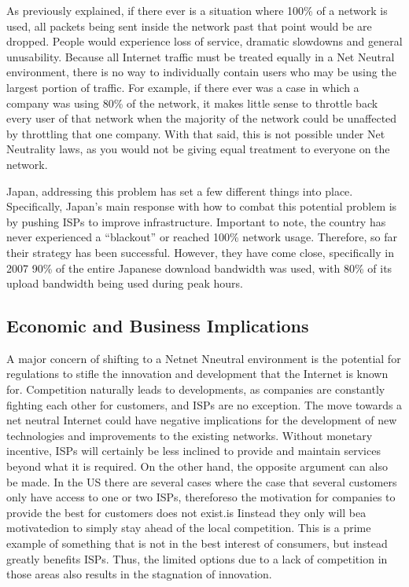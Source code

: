 \documentclass{sigcomm-alternate}
\begin{document}
As previously explained, if there ever is a situation where 100\% of a network is used, all packets being sent inside the network past that point would be are dropped.  People would experience loss of service, dramatic slowdowns and general unusability.  Because all Internet traffic must be treated equally in a Net Neutral environment, there is no way to individually contain users who may be using the largest portion of traffic.  For example, if there ever was a case in which a company was using 80\% of the network, it makes little sense to throttle back every user of that network when the majority of the network could be unaffected by throttling that one company.  With that said, this is not possible under Net Neutrality laws, as you would not be giving equal treatment to everyone on the network.

Japan, addressing this problem has set a few different things into place.   Specifically, Japan’s main response with how to combat this potential problem is by pushing ISPs to improve infrastructure. Important to note, the country has never experienced a “blackout” or reached 100\% network usage.  Therefore, so far their strategy has been successful.  However, they have come close, specifically in 2007 90\% of the entire Japanese download bandwidth was used, with 80\% of its upload bandwidth being used during peak hours.


\subsection{Economic and Business Implications}

A major concern of shifting to a Netnet Nneutral environment is the potential for regulations to stifle the innovation and development that the Internet is known for. Competition naturally leads to developments, as companies are constantly fighting each other for customers, and ISPs are no exception. The move towards a net neutral Internet could have negative implications for the development of new technologies and improvements to the existing networks. Without monetary incentive, ISPs will certainly be less inclined to provide and maintain services beyond what it is required. On the other hand, the opposite argument can also be made. In the US there are several cases where  the case that several customers only have access to one or two ISPs, thereforeso the motivation for companies to provide the best for customers does not exist.is Iinstead they only will bea motivatedion to  simply stay ahead of the local competition. This is a prime example of something that is not in the best interest of consumers, but instead greatly benefits ISPs. Thus, the limited options due to a lack of competition in those areas also results in the stagnation of innovation.
\end{document}
